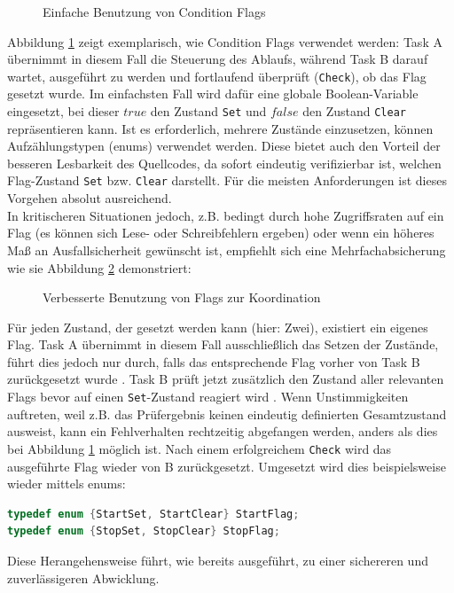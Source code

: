 \documentclass{llncs}
\begin{document}
\begin{figure}[h]
\centering
\def\svgwidth{300pt}

\caption{\label{fig:ConditionFlag} Einfache Benutzung von Condition Flags \autocite[vgl.][83]{Cooling2017}}
\end{figure}

Abbildung \ref{fig:ConditionFlag} zeigt exemplarisch, wie Condition Flags verwendet werden: Task A übernimmt in diesem Fall die Steuerung des Ablaufs, während Task B darauf wartet, ausgeführt zu werden und fortlaufend überprüft (\texttt{Check}), ob das Flag gesetzt wurde. Im einfachsten Fall wird dafür eine globale Boolean-Variable eingesetzt, bei dieser $true$ den Zustand \texttt{Set} und $false$ den Zustand \texttt{Clear} repräsentieren kann. Ist es erforderlich, mehrere Zustände einzusetzen, können Aufzählungstypen (enums) verwendet werden. Diese bietet auch den Vorteil der besseren Lesbarkeit des Quellcodes, da sofort eindeutig verifizierbar ist, welchen Flag-Zustand \texttt{Set} bzw. \texttt{Clear} darstellt. Für die meisten Anforderungen ist dieses Vorgehen absolut ausreichend. \autocite[vgl.][84]{Cooling2017}\\

In kritischeren Situationen jedoch, z.B. bedingt durch hohe Zugriffsraten auf ein Flag (es können sich Lese- oder Schreibfehlern ergeben) oder wenn ein höheres Maß an Ausfallsicherheit gewünscht ist, empfiehlt sich eine Mehrfachabsicherung wie sie Abbildung \ref{fig:ConditionFlag2} demonstriert:

\begin{figure} [h]
	\centering
	\def\svgwidth{300pt}
	
	\caption{\label{fig:ConditionFlag2} Verbesserte Benutzung von Flags zur Koordination \autocite[vgl.][84]{Cooling2017}}
\end{figure}

Für jeden Zustand, der gesetzt werden kann (hier: Zwei), existiert ein eigenes Flag. Task A übernimmt in diesem Fall ausschließlich das Setzen der Zustände, führt dies jedoch nur durch, falls das entsprechende Flag vorher von Task B zurückgesetzt wurde \autocite[vgl.][85]{Cooling2017}. Task B prüft jetzt zusätzlich den Zustand aller relevanten Flags bevor auf einen \texttt{Set}-Zustand reagiert wird \autocite[vgl.][85]{Cooling2017}. Wenn Unstimmigkeiten auftreten, weil z.B. das Prüfergebnis keinen eindeutig definierten Gesamtzustand ausweist, kann ein Fehlverhalten rechtzeitig abgefangen werden, anders als dies bei Abbildung \ref{fig:ConditionFlag} möglich ist. Nach einem erfolgreichem \texttt{Check} wird das ausgeführte Flag wieder von B zurückgesetzt. Umgesetzt wird dies beispielsweise wieder mittels enums:
\begin{lstlisting}[language=C]
typedef enum {StartSet, StartClear} StartFlag;
typedef enum {StopSet, StopClear} StopFlag;
\end{lstlisting}
Diese Herangehensweise führt, wie bereits ausgeführt, zu einer sichereren und zuverlässigeren Abwicklung.\\
\end{document}

